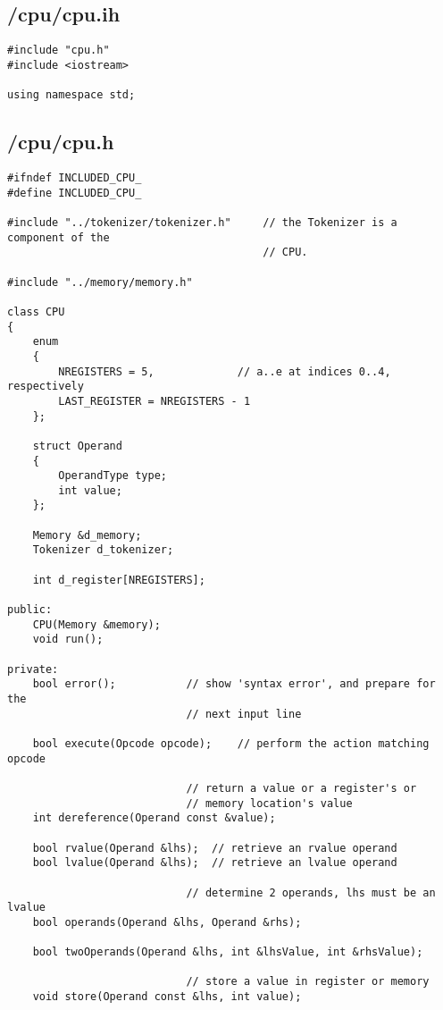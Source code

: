 \documentclass{article}
\begin{document}
\subsection*{/cpu/cpu.ih}
\begin{verbatim}
#include "cpu.h"
#include <iostream>

using namespace std;
\end{verbatim}
\subsection*{/cpu/cpu.h}
\begin{verbatim}
#ifndef INCLUDED_CPU_
#define INCLUDED_CPU_

#include "../tokenizer/tokenizer.h"     // the Tokenizer is a component of the
                                        // CPU.

#include "../memory/memory.h"

class CPU
{
    enum 
    {
        NREGISTERS = 5,             // a..e at indices 0..4, respectively
        LAST_REGISTER = NREGISTERS - 1
    };

    struct Operand
    {
        OperandType type;
        int value;
    };
        
    Memory &d_memory;
    Tokenizer d_tokenizer;

    int d_register[NREGISTERS];

public:
    CPU(Memory &memory);
    void run();

private:
    bool error();           // show 'syntax error', and prepare for the 
                            // next input line

    bool execute(Opcode opcode);    // perform the action matching opcode

                            // return a value or a register's or 
                            // memory location's value
    int dereference(Operand const &value);

    bool rvalue(Operand &lhs);  // retrieve an rvalue operand
    bool lvalue(Operand &lhs);  // retrieve an lvalue operand

                            // determine 2 operands, lhs must be an lvalue
    bool operands(Operand &lhs, Operand &rhs);

    bool twoOperands(Operand &lhs, int &lhsValue, int &rhsValue);

                            // store a value in register or memory
    void store(Operand const &lhs, int value);


\end{verbatim}
\end{document}
